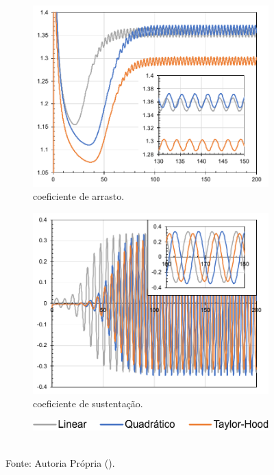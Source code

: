 \begin{figure}[h!]
    \centering
    \caption{Valores ao longo do tempo na simulação VMS de:}
    \begin{subfigure}{.49\textwidth}
        \centering
        \includegraphics[width=\linewidth]{Figuras/cylinder/analise2/VMS-drag.pdf}
        \caption{coeficiente de arrasto.}
    \end{subfigure}
    \begin{subfigure}{.49\textwidth}
        \centering
        \includegraphics[width=\linewidth]{Figuras/cylinder/analise2/VMS-lift.pdf}
        \caption{coeficiente de sustentação.}
    \end{subfigure}
    \begin{subfigure}{\textwidth}
        \centering
        \includegraphics[width=.4\linewidth]{Figuras/cylinder/analise2/legenda.pdf}
    \end{subfigure}
    \\Fonte: Autoria Própria (\the\year).
    \label{fig:cyl-draglift-VMS}
\end{figure}


